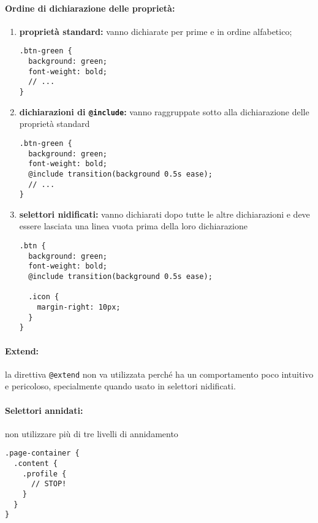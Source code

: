 \documentclass[../ProcessiPrimari.tex]{subfiles}
\begin{document}
\paragraph*{Ordine di dichiarazione delle proprietà:}
\begin{enumerate}
	\item \textbf{proprietà standard:} vanno dichiarate per prime e in ordine alfabetico;
\begin{center}{
\begin{minipage}{5cm}
\begin{Verbatim}[frame=single]
.btn-green {
  background: green;
  font-weight: bold;
  // ...
}
\end{Verbatim}
\end{minipage}
}
\end{center}
	\item \textbf{dichiarazioni di \texttt{@include}:} vanno raggruppate sotto alla dichiarazione delle proprietà standard
\begin{center}{
\begin{minipage}{10cm}
\begin{Verbatim}[frame=single]
.btn-green {
  background: green;
  font-weight: bold;
  @include transition(background 0.5s ease);
  // ...
}
\end{Verbatim}
\end{minipage}
}
\end{center}
\item \textbf{selettori nidificati:} vanno dichiarati dopo tutte le altre dichiarazioni e deve essere lasciata una linea vuota prima della loro dichiarazione
\begin{center}{
\begin{minipage}{10cm}
\begin{Verbatim}[frame=single]
.btn {
  background: green;
  font-weight: bold;
  @include transition(background 0.5s ease);

  .icon {
    margin-right: 10px;
  }
}
\end{Verbatim}
\end{minipage}
}
\end{center}
\end{enumerate}
\paragraph*{Extend:}
la direttiva \texttt{@extend} non va utilizzata perché ha un comportamento poco intuitivo e pericoloso, specialmente quando usato in selettori nidificati.
\paragraph*{Selettori annidati: }
non utilizzare più di tre livelli di annidamento
\begin{center}{
\begin{minipage}{5cm}
\begin{Verbatim}[frame=single]
.page-container {
  .content {
    .profile {
      // STOP!
    }
  }
}
\end{Verbatim}
\end{minipage}
}
\end{center}

	
\end{document}
